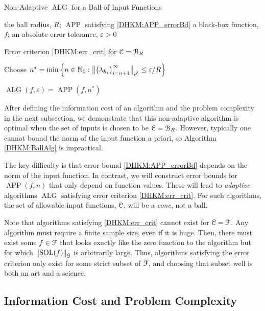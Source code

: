 \documentclass[USenglish]{article}
\theoremstyle{dgthm}
\theoremstyle{dgthm}
\theoremstyle{dgthm}
\theoremstyle{dgthm}
\theoremstyle{dgdef}
\theoremstyle{definition}
\DeclareMathOperator{\SOL}{SOL}
\DeclareMathOperator{\APP}{APP}
\DeclareMathOperator{\ALG}{ALG}
\newcommand{\norm}[2][{}]{\ensuremath{\left \lVert #2 \right \rVert}_{#1}}
\newcommand{\bignorm}[2][{}]{\ensuremath{\bigl \lVert #2 \bigr \rVert}_{#1}}
\begin{document}
\begin{algorithm}
\caption{Non-Adaptive $\ALG$ for a Ball of Input Functions \label{DHKM:BallAlg}}
	\begin{algorithmic}
	\PARAM the ball radius, $R$; $\APP$ satisfying \eqref{DHKM:APP_errorBd}
	\INPUT a black-box function, $f$; an absolute error tolerance, $\varepsilon>0$

    \Ensure Error criterion \eqref{DHKM:err_crit} for ${\mathcal{C}} = {\mathcal{B}}_{R}$

    \State Choose $n^* =  \min \left \{n \in \N_0 : \bignorm[\rho']{\bigl(  \lambda_{\bsk_i}  \bigr)_{i = n+1}^{\infty}} \le \varepsilon /R \right \}$

    \RETURN $\ALG(f,\varepsilon) = \APP(f,n^*)$
\end{algorithmic}
\end{algorithm}

After defining the information cost of an algorithm and the problem complexity in the next subsection, we demonstrate that this non-adaptive algorithm is optimal when the set of inputs is chosen to be ${\mathcal{C}} = {\mathcal{B}}_R$. However, typically one cannot bound the norm of the input function a priori, so Algorithm \ref{DHKM:BallAlg} is impractical. 

The key difficulty is that error bound \eqref{DHKM:APP_errorBd} depends on the norm of the input function.  In contrast, we will construct  error bounds for $\APP(f,n)$ that only depend on function values.  These will lead to \emph{adaptive} algorithms $\ALG$ satisfying error criterion \eqref{DHKM:err_crit}.  For such algorithms, the set of allowable input functions, ${\mathcal{C}}$, will be a \emph{cone}, not a ball.

Note that algorithms satisfying \eqref{DHKM:err_crit} cannot exist for ${\mathcal{C}} = {\mathcal{F}}$. Any algorithm must require a finite sample size, even if it is huge.  Then, there must exist some $f \in {\mathcal{F}}$ that looks exactly like the zero function to the algorithm but for which $\norm[\calG]{\SOL(f)}$ is arbitrarily large.  Thus, algorithms satisfying the error criterion only exist for some strict subset of ${\mathcal{F}}$, and choosing that subset well is both an art and a science.


\subsection{Information Cost and Problem Complexity}
\end{document}
